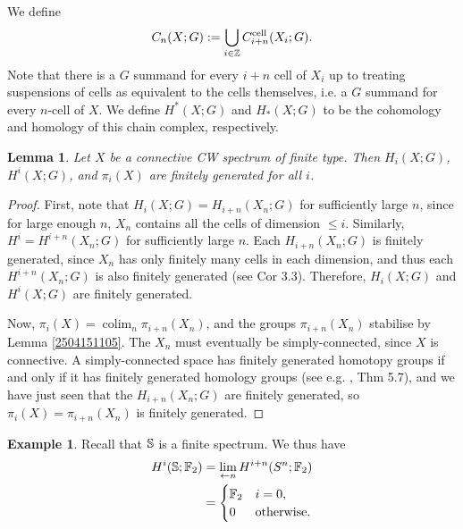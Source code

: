 \documentclass[11pt, titlepage]{article} %
\def\bb{\ensuremath\mathbb}
\def\subq{\ensuremath\subseteq}
\def\inte{\ensuremath\mathbb{Z}}
\DeclareMathOperator{\colim}{colim}
\numberwithin{equation}{subsection}
\theoremstyle{plain}
\newtheorem{lemma}[theorem]{Lemma}
\theoremstyle{definition}
\newtheorem{example}[theorem]{Example}
\begin{document}
We define
\[C_n(X ; G):=\bigcup_{i\in \inte}C^\text{cell}_{i+n}(X_i; G).\] 
Note that there is a \(G\) summand for every \(i+n\) cell of \(X_i\) up to treating suspensions of cells as equivalent to the cells themselves, i.e. a \(G\) summand for every \(n\)-cell of \(X\). We define \(H^*(X;G)\) and \(H_*(X;G)\) to be the cohomology and homology of this chain complex, respectively.

\begin{lemma}\label{2504141556}
Let \(X\) be a connective CW spectrum of finite type. Then \(H_i(X;G)\), \(H^i(X;G)\), and \(\pi_i(X)\) are finitely generated for all \(i\). 
\end{lemma}

\begin{proof}
First, note that \(H_i(X;G)=H_{i+n}(X_n;G)\) for sufficiently large \(n\), since for large enough \(n\), \(X_n\) contains all the cells of dimension \(\leq i\). Similarly, \(H^i=H^{i+n}(X_n;G)\) for sufficiently large \(n\). Each \(H_{i+n}(X_n;G)\) is finitely generated, since \(X_n\) has only finitely many cells in each dimension, and thus each \(H^{i+n}(X_n;G)\) is also finitely generated (see \autocite{hatcher} Cor 3.3). Therefore, \(H_i(X;G)\) and \(H^i(X;G)\) are finitely generated. 

Now, \(\pi_i(X)=\colim_n \pi_{i+n}(X_n)\), and the groups \(\pi_{i+n}(X_n)\) stabilise by Lemma \ref{2504151105}. The \(X_n\) must eventually be simply-connected, since \(X\) is connective. %
A simply-connected space has finitely generated homotopy groups if and only if it has finitely generated homology groups (see e.g. \autocite{hatcher}, Thm 5.7), and we have just seen that the \(H_{i+n}(X_n;G)\) are finitely generated, so \(\pi_i(X)=\pi_{i+n}(X_n)\) is finitely generated. 
\end{proof}

\begin{example}
Recall that \(\bb{S}\) is a finite spectrum. We thus have
\begin{align*}
H^i(\bb{S}; \bb{F}_2)&=\lim\limits_{\leftarrow n}H^{i+n}(S^n; \bb{F}_2)\\
&=\begin{cases}
\bb{F}_2 & i = 0,\\
0 & \text{otherwise.}
\end{cases}
\end{align*}
\end{example}
\end{document}
